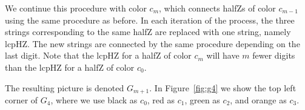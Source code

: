 \documentclass[12pt,reqno]{article}
\theoremstyle{plain}
\theoremstyle{definition}
\theoremstyle{remark}
\begin{document}
We continue this procedure with color $c_m$, which connects halfZs of color $c_{m-1}$ using the same procedure as before. In each iteration of the process, the three strings corresponding to the same halfZ are replaced with one string, namely lcpHZ. The new strings are connected by the same procedure depending on the last digit. 
Note that the lcpHZ for a halfZ of color $c_m$ will have $m$ fewer digits than the lcpHZ for a halfZ of color $c_0$.

The resulting picture is denoted $G_{m+1}$. In Figure~\ref{fig:g4} we show the top left corner of $G_4$, where we use black as $c_0$, red as $c_1$, green as $c_2$, and orange as $c_3$.

\begin{figure}[h]
    \centering
{}
\end{figure}
\end{document}
